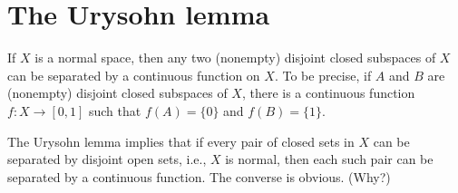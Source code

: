 \section{The Urysohn lemma}
\begin{thm}\label{Urysohn lemma}
    If $X$ is a normal space, then any two (nonempty) disjoint closed subspaces of $X$ can be separated by a continuous function on $X$.
    To be precise, if $A$ and $B$ are (nonempty) disjoint closed subspaces of $X$, there is a continuous function $f: X\rightarrow[0, 1]$ such that $f(A)=\{0\}$ and $f(B)=\{1\}$.
\end{thm}
\begin{rmk}
    The Urysohn lemma implies that if every pair of closed sets in $X$ can be separated by disjoint open sets, i.e., $X$ is normal, then each such pair can be separated by a continuous function.
    The converse is obvious. \color{brown}(Why?)\color{black}
\end{rmk}

